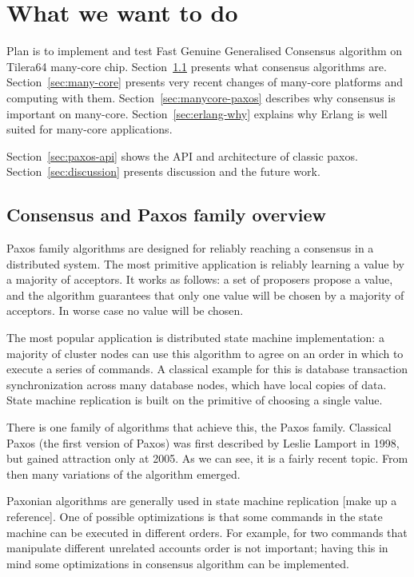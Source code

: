 \documentclass[english,11pt]{article}
\begin{document}
\section{What we want to do}

Plan is to implement and test Fast Genuine Generalised Consensus algorithm on
Tilera64 many-core chip. Section~\ref{sec:paxos-family} presents what consensus
algorithms are. Section~\ref{sec:many-core} presents very recent changes of
many-core platforms and computing with them. Section~\ref{sec:manycore-paxos}
describes why consensus is important on many-core. Section~\ref{sec:erlang-why}
explains why Erlang is well suited for many-core applications.

Section~\ref{sec:paxos-api} shows the API and architecture of classic paxos.
Section~\ref{sec:discussion} presents discussion and the future work.

\subsection{Consensus and Paxos family overview}
\label{sec:paxos-family}

Paxos family algorithms are designed for reliably reaching a consensus in a
distributed system. The most primitive application is reliably learning a value
by a majority of acceptors. It works as follows: a set of proposers propose a
value, and the algorithm guarantees that only one value will be chosen by a
majority of acceptors. In worse case no value will be chosen.

The most popular application is distributed state machine implementation: a
majority of cluster nodes can use this algorithm to agree on an order in which
to execute a series of commands. A classical example for this is database
transaction synchronization across many database nodes, which have local copies
of data. State machine replication is built on the primitive of choosing a
single value.

There is one family of algorithms that achieve this, the Paxos family.
Classical Paxos (the first version of Paxos) was first described by Leslie
Lamport in 1998\cite{classic-paxos}, but gained attraction only at 2005. As we
can see, it is a fairly recent topic. From then many variations of the algorithm
emerged.

Paxonian algorithms are generally used in state machine replication [make up a
reference]. One of possible optimizations is that some commands in the state
machine can be executed in different orders. For example, for two commands that
manipulate different unrelated accounts order is not important; having this in
mind some optimizations in consensus algorithm can be implemented.
\end{document}
